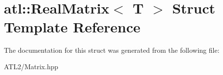 \hypertarget{structatl_1_1_real_matrix}{\section{atl\+:\+:Real\+Matrix$<$ T $>$ Struct Template Reference}
\label{structatl_1_1_real_matrix}
}


The documentation for this struct was generated from the following file\+:\begin{DoxyCompactItemize}
\item 
A\+T\+L2/Matrix.\+hpp\end{DoxyCompactItemize}
